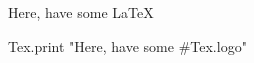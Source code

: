 \documentclass{article}
\begin{document}
\noindent Here, have some \LaTeX\\
\begin{rbtex}
Tex.print "Here, have some #{Tex.logo}"
\end{rbtex}
\end{document}

